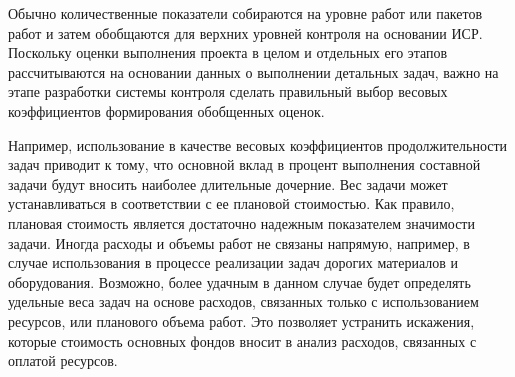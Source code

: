 Обычно количественные показатели собираются на уровне работ или пакетов работ и затем обобщаются для верхних уровней контроля на основании ИСР.
Поскольку оценки выполнения проекта в целом и отдельных его этапов рассчитываются на основании данных о выполнении детальных задач, важно на этапе разработки системы контроля сделать правильный выбор весовых коэффициентов формирования обобщенных оценок.

Например, использование в качестве весовых коэффициентов продолжительности задач приводит к тому, что основной вклад в процент выполнения составной задачи будут вносить наиболее длительные дочерние.
Вес задачи может устанавливаться в соответствии с ее плановой стоимостью.
Как правило, плановая стоимость является достаточно надежным показателем значимости задачи.
Иногда расходы и объемы работ не связаны напрямую, например, в случае использования в процессе реализации задач дорогих материалов и оборудования.
Возможно, более удачным в данном случае будет определять удельные веса задач на основе расходов, связанных только с использованием ресурсов, или планового объема работ. Это позволяет устранить искажения, которые стоимость основных фондов вносит в анализ расходов, связанных с оплатой ресурсов.